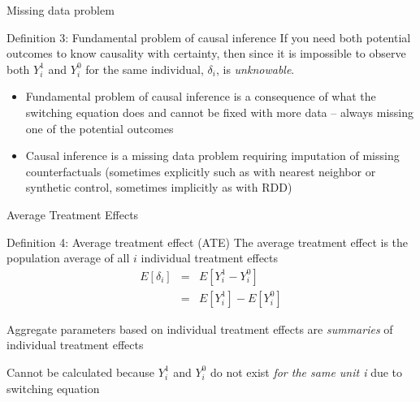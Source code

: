 \documentclass{beamer}
\begin{document}
\begin{frame}{Missing data problem}


    \begin{block}{Definition 3: Fundamental problem of causal inference}
      If you need both potential outcomes to know causality with certainty, then since it is impossible to observe both $Y_i^1$ and $Y_i^0$ for the same individual, $\delta_i$, is \emph{unknowable}.
    \end{block}
    
      \begin{itemize}
    \item Fundamental problem of causal inference is a consequence of what the switching equation does and cannot be fixed with more data -- always missing one of the potential outcomes
    \item Causal inference is a missing data problem requiring imputation of missing counterfactuals (sometimes explicitly such as with nearest neighbor or synthetic control, sometimes implicitly as with RDD)
  \end{itemize}

    
\end{frame}



\begin{frame}{Average Treatment Effects}

  \begin{block}{Definition 4: Average treatment effect (ATE)}
    The average treatment effect is the population average of all $i$ individual treatment effects
    \begin{eqnarray*}
      E[\delta_i]&=&E[Y_i^1-Y_i^0]\\
      &=&E[Y^1_i] - E[Y^0_i]
    \end{eqnarray*}
  \end{block}

  \bigskip

Aggregate parameters based on individual treatment effects are \emph{summaries} of individual treatment effects

\bigskip

  Cannot be calculated because $Y^1_i$ and $Y^0_i$ do not exist \emph{for the same unit i} due to switching equation

\end{frame}
\end{document}
